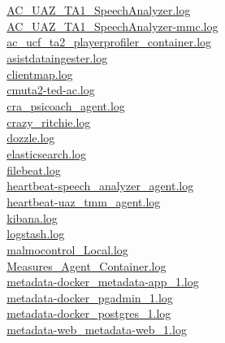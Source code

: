 \verb|              |\hyperref[AC_UAZ_TA1_SpeechAnalyzer.log]{AC\_UAZ\_TA1\_SpeechAnalyzer.log}\\
\verb|              |\hyperref[AC_UAZ_TA1_SpeechAnalyzer-mmc.log]{AC\_UAZ\_TA1\_SpeechAnalyzer-mmc.log}\\
\verb|              |\hyperref[ac_ucf_ta2_playerprofiler_container.log]{ac\_ucf\_ta2\_playerprofiler\_container.log}\\
\verb|              |\hyperref[asistdataingester.log]{asistdataingester.log}\\
\verb|              |\hyperref[clientmap.log]{clientmap.log}\\
\verb|              |\hyperref[cmuta2-ted-ac.log]{cmuta2-ted-ac.log}\\
\verb|              |\hyperref[cra_psicoach_agent.log]{cra\_psicoach\_agent.log}\\
\verb|              |\hyperref[crazy_ritchie.log]{crazy\_ritchie.log}\\
\verb|              |\hyperref[dozzle.log]{dozzle.log}\\
\verb|              |\hyperref[elasticsearch.log]{elasticsearch.log}\\
\verb|              |\hyperref[filebeat.log]{filebeat.log}\\
\verb|              |\hyperref[heartbeat-speech_analyzer_agent.log]{heartbeat-speech\_analyzer\_agent.log}\\
\verb|              |\hyperref[heartbeat-uaz_tmm_agent.log]{heartbeat-uaz\_tmm\_agent.log}\\
\verb|              |\hyperref[kibana.log]{kibana.log}\\
\verb|              |\hyperref[logstash.log]{logstash.log}\\
\verb|              |\hyperref[malmocontrol_Local.log]{malmocontrol\_Local.log}\\
\verb|              |\hyperref[Measures_Agent_Container.log]{Measures\_Agent\_Container.log}\\
\verb|              |\hyperref[metadata-docker_metadata-app_1.log]{metadata-docker\_metadata-app\_1.log}\\
\verb|              |\hyperref[metadata-docker_pgadmin_1.log]{metadata-docker\_pgadmin\_1.log}\\
\verb|              |\hyperref[metadata-docker_postgres_1.log]{metadata-docker\_postgres\_1.log}\\
\verb|              |\hyperref[metadata-web_metadata-web_1.log]{metadata-web\_metadata-web\_1.log}\\
